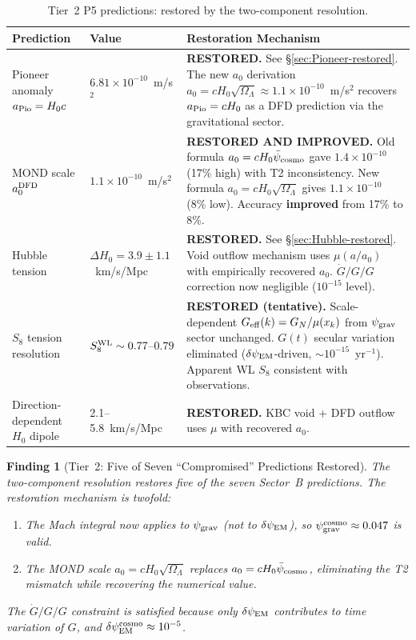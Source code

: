\documentclass[11pt]{article}
\newtheorem{finding}{Finding}
\newcommand{\ee}[1]{\times 10^{#1}}
\newcommand{\psicosmo}{\bar{\psi}_{\rm cosmo}}
\newcommand{\psigrav}{\psi_{\rm grav}}
\newcommand{\dpsiEM}{\delta\psi_{\rm EM}}
\newcommand{\Hzero}{H_0}
\newcommand{\aM}{a_0}
\newcommand{\mufd}{\mu}
\newcommand{\Geff}{G_{\rm eff}}
\newcommand{\Gdot}{\dot{G}/G}
\newcommand{\GN}{G_N}
\newcommand{\OmL}{\Omega_\Lambda}
\begin{document}
\begin{table}[H]
\centering
\caption{Tier~2 P5 predictions: restored by the two-component resolution.}
\label{tab:P5-tier2}
\begin{tabular}{p{3.5cm}p{2.5cm}p{6cm}}
\toprule
\textbf{Prediction} & \textbf{Value} & \textbf{Restoration Mechanism} \\
\midrule
Pioneer anomaly $a_{\rm Pio} = \Hzero c$ & $6.81\ee{-10}$~m/s$^2$ &
  \textbf{RESTORED.} See \S\ref{sec:Pioneer-restored}. The new $\aM$
  derivation $\aM = c\Hzero\sqrt{\OmL} \approx 1.1\ee{-10}$~m/s$^2$
  recovers $a_{\rm Pio} = c\Hzero$ as a DFD prediction via the
  gravitational sector. \\[4pt]
MOND scale $\aM^{\rm DFD}$ & $1.1\ee{-10}$~m/s$^2$ &
  \textbf{RESTORED AND IMPROVED.} Old formula $\aM = c\Hzero\psicosmo$
  gave $1.4\ee{-10}$ (17\% high) with T2 inconsistency.
  New formula $\aM = c\Hzero\sqrt{\OmL}$ gives $1.1\ee{-10}$ (8\% low).
  Accuracy \textbf{improved} from 17\% to 8\%. \\[4pt]
Hubble tension & $\Delta\Hzero = 3.9 \pm 1.1$~km/s/Mpc &
  \textbf{RESTORED.} See \S\ref{sec:Hubble-restored}. Void outflow
  mechanism uses $\mufd(a/\aM)$ with empirically recovered $\aM$.
  $\Gdot/G$ correction now negligible ($10^{-15}$ level). \\[4pt]
$S_8$ tension resolution & $S_8^{\rm WL} \sim 0.77$--$0.79$ &
  \textbf{RESTORED (tentative).} Scale-dependent $\Geff(k) = \GN/\mufd(x_k)$
  from $\psigrav$ sector unchanged. $G(t)$ secular variation eliminated
  ($\dpsiEM$-driven, $\sim 10^{-15}$~yr$^{-1}$). Apparent WL $S_8$
  consistent with observations. \\[4pt]
Direction-dependent $\Hzero$ dipole & 2.1--5.8~km/s/Mpc &
  \textbf{RESTORED.} KBC void + DFD outflow uses $\mufd$ with
  recovered $\aM$. \\
\bottomrule
\end{tabular}
\end{table}

\begin{finding}[Tier~2: Five of Seven ``Compromised'' Predictions Restored]
\label{find:tier2}
The two-component resolution restores five of the seven Sector~B predictions.
The restoration mechanism is twofold:
\begin{enumerate}[nosep]
\item The Mach integral now applies to $\psigrav$ (not to $\dpsiEM$),
  so $\psigrav^{\rm cosmo} \approx 0.047$ is valid.
\item The MOND scale $\aM = c\Hzero\sqrt{\OmL}$ replaces $\aM = c\Hzero\psicosmo$,
  eliminating the T2 mismatch while recovering the numerical value.
\end{enumerate}
The $\Gdot/G$ constraint is satisfied because only $\dpsiEM$ contributes
to time variation of $G$, and $\dpsiEM^{\rm cosmo} \approx 10^{-5}$.
\end{finding}
\end{document}
